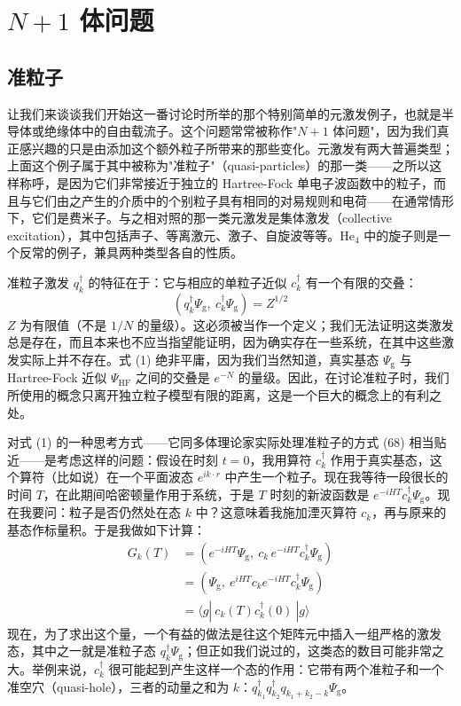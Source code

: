 \section{$N+1$ 体问题}

\subsection{准粒子}

让我们来谈谈我们开始这一番讨论时所举的那个特别简单的元激发例子，也就是半导体或绝缘体中的自由载流子。这个问题常常被称作"$N+1$ 体问题"，因为我们真正感兴趣的只是由添加这个额外粒子所带来的那些变化。元激发有两大普遍类型；上面这个例子属于其中被称为"准粒子"（quasi-particles）的那一类——之所以这样称呼，是因为它们非常接近于独立的 Hartree-Fock 单电子波函数中的粒子，而且与它们由之产生的介质中的个别粒子具有相同的对易规则和电荷——在通常情形下，它们是费米子。与之相对照的那一类元激发是集体激发（collective excitation），其中包括声子、等离激元、激子、自旋波等等。$\mathrm{He}_4$ 中的旋子则是一个反常的例子，兼具两种类型各自的性质。

准粒子激发 $q^{\dagger}_{k}$ 的特征在于：它与相应的单粒子近似 $c^{\dagger}_{k}$ 有一个有限的交叠：
\begin{equation*}
\left(q^{\dagger}_{k}\Psi_{\mathrm{g}},\ c^{\dagger}_{k}\Psi_{\mathrm{g}}\right) = Z^{1/2} \tag{1}
\end{equation*}
$Z$ 为有限值（不是 $1/N$ 的量级）。这必须被当作一个定义；我们无法证明这类激发总是存在，而且本来也不应当指望能证明，因为确实存在一些系统，在其中这些激发实际上并不存在。式 (1) 绝非平庸，因为我们当然知道，真实基态 $\Psi_{\mathrm{g}}$ 与 Hartree-Fock 近似 $\Psi_{\mathrm{HF}}$ 之间的交叠是 $e^{-N}$ 的量级。因此，在讨论准粒子时，我们所使用的概念只离开独立粒子模型有限的距离，这是一个巨大的概念上的有利之处。

对式 (1) 的一种思考方式——它同多体理论家实际处理准粒子的方式 (68) 相当贴近——是考虑这样的问题：假设在时刻 $t=0$，我用算符 $c^{\dagger}_{k}$ 作用于真实基态，这个算符（比如说）在一个平面波态 $e^{ik\cdot r}$ 中产生一个粒子。现在我等待一段很长的时间 $T$，在此期间哈密顿量作用于系统，于是 $T$ 时刻的新波函数是 $e^{-iHT}c^{\dagger}_{k}\Psi_{\mathrm{g}}$。现在我要问：粒子是否仍然处在态 $k$ 中？这意味着我施加湮灭算符 $c_{k}$，再与原来的基态作标量积。于是我做如下计算：
\begin{align*}
G_{k}(T) &= \left(e^{-iHT}\Psi_{\mathrm{g}},\ c_{k}\,e^{-iHT}c^{\dagger}_{k}\Psi_{\mathrm{g}}\right)\\
&= \left(\Psi_{\mathrm{g}},\ e^{iHT}c_{k}e^{-iHT}c^{\dagger}_{k}\Psi_{\mathrm{g}}\right)\\
&= \langle g|\ c_{k}(T)c^{\dagger}_{k}(0)\ |g\rangle \tag{2}
\end{align*}
现在，为了求出这个量，一个有益的做法是往这个矩阵元中插入一组严格的激发态，其中之一就是准粒子态 $q^{\dagger}_{k}\Psi_{\mathrm{g}}$；但正如我们说过的，这类态的数目可能非常之大。举例来说，$c^{\dagger}_{k}$ 很可能起到产生这样一个态的作用：它带有两个准粒子和一个准空穴（quasi-hole），三者的动量之和为 $k$：$q^{\dagger}_{k_{1}}q^{\dagger}_{k_{2}}q_{k_{1}+k_{2}-k}\Psi_{\mathrm{g}}$。

